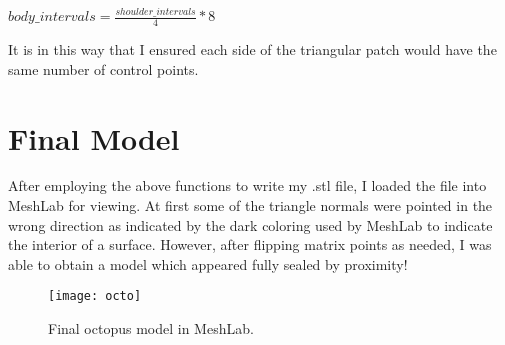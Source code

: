 \documentclass[twocolumn]{article}
\begin{document}
\begin{center}
$body\_intervals = \frac{shoulder\_intervals}{4} * 8 $ 
\end{center}


It is in this way that I ensured each side of the triangular patch would have the same number of control points.

\section{Final Model}

After employing the above functions to write my .stl file, I loaded the file into MeshLab for viewing. At first some of the triangle normals were pointed in the wrong direction as indicated by the dark coloring used by MeshLab to indicate the interior of a surface. However, after flipping matrix points as needed, I was able to obtain a model which appeared fully sealed by proximity!

\begin{figure}
\begin{center}
\texttt{[image: octo]}
\caption{Final octopus model in MeshLab.}
\end{center}
\end{figure}
\end{document}
